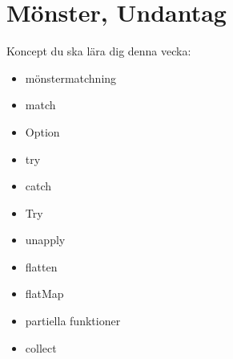 \chapter{Mönster, Undantag}\label{chapter:W08}
Koncept du ska lära dig denna vecka:
\begin{multicols}{2}\begin{itemize}[nosep,label={$\square$},leftmargin=*]
\item mönstermatchning
\item match
\item Option
\item try
\item catch
\item Try
\item unapply
\item flatten
\item flatMap
\item partiella funktioner
\item collect\end{itemize}\end{multicols}
